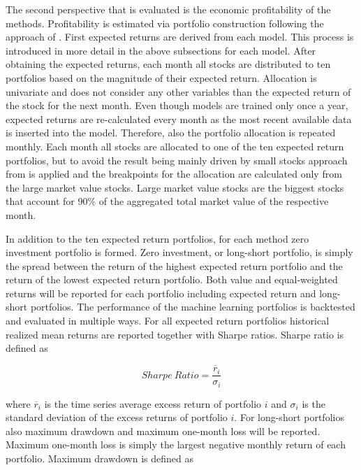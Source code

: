\documentclass[12pt]{article}
\begin{document}
The second perspective that is evaluated is the economic profitability of the methods. Profitability is estimated via portfolio construction following the approach of \citet{Lewellen2015}. First expected returns are derived from each model. This process is introduced in more detail in the above subsections for each model. After obtaining the expected returns, each month all stocks are distributed to ten portfolios based on the magnitude of their expected return. Allocation is univariate and does not consider any other variables than the expected return of the stock for the next month. Even though models are trained only once a year, expected returns are re-calculated every month as the most recent available data is inserted into the model. Therefore, also the portfolio allocation is repeated monthly. Each month all stocks are allocated to one of the ten expected return portfolios, but to avoid the result being mainly driven by small stocks approach from \citet{HANAUER2023} is applied and the breakpoints for the allocation are calculated only from the large market value stocks. Large market value stocks are the biggest stocks that account for 90\% of the aggregated total market value of the respective month. \par

In addition to the ten expected return portfolios, for each method zero investment portfolio is formed. Zero investment, or long-short portfolio, is simply the spread between the return of the highest expected return portfolio and the return of the lowest expected return portfolio. Both value and equal-weighted returns will be reported for each portfolio including expected return and long-short portfolios. The performance of the machine learning portfolios is backtested and evaluated in multiple ways. For all expected return portfolios historical realized mean returns are reported together with Sharpe ratios. Sharpe ratio is defined as

\begin{equation}
\label{eq:SharpeRatio}
Sharpe \ Ratio = \frac{\overline{r}_i}{\sigma_i}
\end{equation}

where $\overline{r}_i$ is the time series average excess return of portfolio $i$ and $\sigma_i$ is the standard deviation of the excess returns of portfolio $i$. For long-short portfolios also maximum drawdown and maximum one-month loss will be reported. Maximum one-month loss is simply the largest negative monthly return of each portfolio. Maximum drawdown is defined as \par
\end{document}
